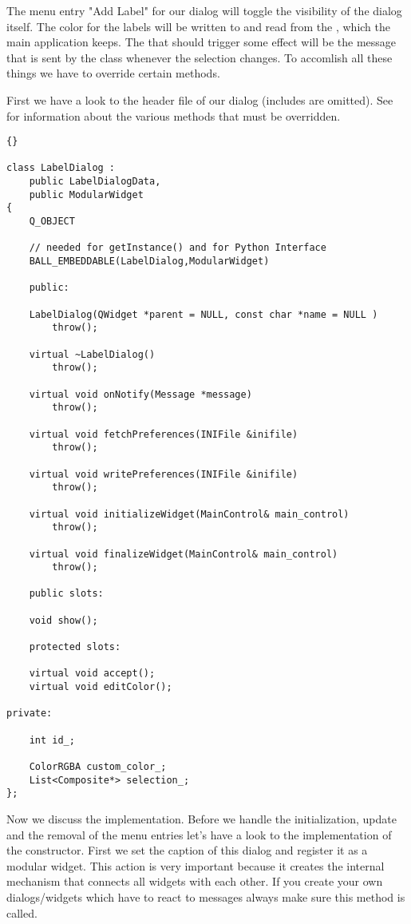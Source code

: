 The menu entry "Add Label" for our dialog will toggle the visibility of the dialog itself.
The color for the labels will be written to
and read from the , which the main application keeps. The
 that should trigger some effect will be the message 
 that is sent by the class  
whenever the selection changes. To accomlish all these things we have to 
override certain methods.

First we have a look to the header file of our dialog (includes are omitted).
See  for information about the various methods that must
be overridden.

\begin{lstlisting}{}

class LabelDialog : 
	public LabelDialogData,
	public ModularWidget
{
	Q_OBJECT
	
	// needed for getInstance() and for Python Interface
	BALL_EMBEDDABLE(LabelDialog,ModularWidget)
		
	public:
	
	LabelDialog(QWidget *parent = NULL, const char *name = NULL )
		throw();

	virtual ~LabelDialog()
		throw();
					
	virtual void onNotify(Message *message)
		throw();
					
	virtual void fetchPreferences(INIFile &inifile)
		throw();
	
	virtual void writePreferences(INIFile &inifile)
		throw();
		
	virtual void initializeWidget(MainControl& main_control)
		throw();
	
	virtual void finalizeWidget(MainControl& main_control)
		throw();
				
	public slots:

	void show();

	protected slots:
					
	virtual void accept();
	virtual void editColor();

private:
	
	int id_;
	
	ColorRGBA custom_color_;
	List<Composite*> selection_;
};
\end{lstlisting}

Now we discuss the implementation. Before we handle the initialization,
update and the removal of the menu entries let's have a look to the
implementation of the constructor. First we set the caption of this dialog
and register it as a modular widget. This action is very important because it
creates the internal mechanism that connects all widgets with each other. If
you create your own dialogs/widgets which have to react to messages always make 
sure this method is called.

